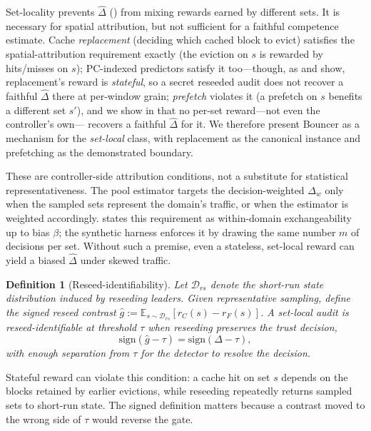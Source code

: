 \documentclass{article}
\newtheorem{definition}{Definition}
\newcommand{\dhat}{\hat{\Delta}}
\begin{document}
Set-locality prevents $\dhat$ () from mixing rewards earned by
different sets. It is necessary for spatial attribution, but not sufficient for a
faithful competence estimate. Cache \emph{replacement} (deciding which cached block to evict) satisfies the spatial-attribution requirement exactly
(the eviction on $s$ is rewarded by hits/misses on $s$); PC-indexed predictors
satisfy it too---though, as  and 
show, replacement's reward is \emph{stateful}, so a secret reseeded audit does
not recover a faithful $\dhat$ there at per-window grain; \emph{prefetch}
violates it (a prefetch on $s$ benefits a different set $s'$), and we show in
 that no per-set reward---not even the controller's own---
recovers a faithful $\dhat$ for it. We therefore present Bouncer as a mechanism for
the \emph{set-local} class, with replacement as the canonical instance and
prefetching as the demonstrated boundary.

These are controller-side attribution conditions, not a substitute for statistical
representativeness. The pool estimator targets the decision-weighted $\Delta_w$
only when the sampled sets represent the domain's traffic, or when the estimator is
weighted accordingly.  states this requirement as within-domain
exchangeability up to bias $\beta$; the synthetic harness enforces it by drawing the
same number $m$ of decisions per set. Without such a premise, even a stateless,
set-local reward can yield a biased $\dhat$ under skewed traffic.

\begin{definition}[Reseed-identifiability]\label{rem:stateless}
Let $\mathcal{D}_{rs}$ denote the short-run state distribution induced by
reseeding leaders. Given representative sampling, define the signed reseed contrast
$\hat g:=\mathbb{E}_{s\sim\mathcal{D}_{rs}}[r_C(s)-r_F(s)]$. A set-local audit is
\emph{reseed-identifiable} at threshold $\tau$ when reseeding preserves the trust
decision,
\[
\mathrm{sign}(\hat g-\tau)=\mathrm{sign}(\Delta-\tau),
\]
with enough separation from $\tau$ for the detector to resolve the decision.
\end{definition}

Stateful reward can violate this condition: a cache hit on set $s$ depends on the
blocks retained by earlier evictions, while reseeding repeatedly returns sampled
sets to short-run state. The signed definition matters because a contrast moved to
the wrong side of $\tau$ would reverse the gate.
\end{document}
